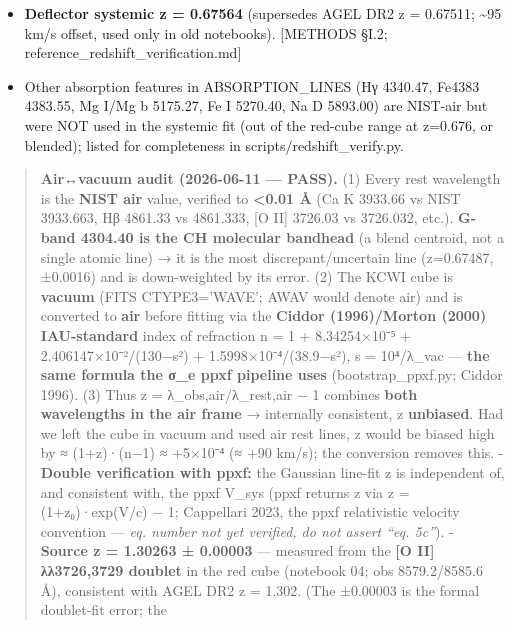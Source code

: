 \documentclass[
]{article}
\providecommand{\tightlist}{%
  \setlength{\itemsep}{0pt}\setlength{\parskip}{0pt}}
\newcommand{\BreakablePath}[1]{{\ttfamily\sloppy #1}}
\begin{document}
\begin{itemize}
\tightlist
\item
  \textbf{Deflector systemic z = 0.67564} (supersedes AGEL DR2 z =
  0.67511; \textasciitilde95 km/s offset, used only in old notebooks).
  {[}METHODS §I.2; reference\_redshift\_verification.md{]}
\item
  Other absorption features in
  \BreakablePath{ABSORPTION\_\discretionary{}{}{}LINES} (Hγ 4340.47,
  Fe4383 4383.55, Mg I/Mg b 5175.27, Fe I 5270.40, Na D 5893.00) are
  NIST-air but were NOT used in the systemic fit (out of the red-cube
  range at z=0.676, or blended); listed for completeness in
  \BreakablePath{scripts/\discretionary{}{}{}redshift\_\discretionary{}{}{}verify.\discretionary{}{}{}py}.
\end{itemize}

\begin{quote}
\textbf{Air↔vacuum audit (2026-06-11 --- PASS).} (1) Every rest
wavelength is the \textbf{NIST air} value, verified to
\textbf{\textless0.01 Å} (Ca K 3933.66 vs NIST 3933.663, Hβ 4861.33 vs
4861.333, {[}O II{]} 3726.03 vs 3726.032, etc.). \textbf{G-band 4304.40
is the CH molecular bandhead} (a blend centroid, not a single atomic
line) → it is the most discrepant/uncertain line (z=0.67487, ±0.0016)
and is down-weighted by its error. (2) The KCWI cube is \textbf{vacuum}
(FITS \BreakablePath{CTYPE3='WAVE'}; \BreakablePath{AWAV} would denote
air) and is converted to \textbf{air} before fitting via the
\textbf{Ciddor (1996)/Morton (2000) IAU-standard} index of refraction n
= 1 + 8.34254×10⁻⁵ + 2.406147×10⁻²/(130−s²) + 1.5998×10⁻⁴/(38.9−s²), s =
10⁴/λ\_vac --- \textbf{the same formula the σ\_e ppxf pipeline uses}
(\BreakablePath{bootstrap\_\discretionary{}{}{}ppxf.\discretionary{}{}{}py};
Ciddor 1996). (3) Thus z = λ\_obs,air/λ\_rest,air − 1 combines
\textbf{both wavelengths in the air frame} → internally consistent, z
\textbf{unbiased}. Had we left the cube in vacuum and used air rest
lines, z would be biased high by ≈ (1+z)·(n−1) ≈ +5×10⁻⁴ (≈ +90 km/s);
the conversion removes this. - \textbf{Double verification with ppxf:}
the Gaussian line-fit z is independent of, and consistent with, the ppxf
V\_sys (ppxf returns z via z = (1+z₀)·exp(V/c) − 1; Cappellari 2023, the
ppxf relativistic velocity convention --- \emph{eq. number not yet
verified, do not assert ``eq. 5c''}). - \textbf{Source z = 1.30263 ±
0.00003} --- measured from the \textbf{{[}O II{]} λλ3726,3729 doublet}
in the red cube (notebook 04; obs 8579.2/8585.6 Å), consistent with AGEL
DR2 z = 1.302. (The ±0.00003 is the formal doublet-fit error; the

\end{quote}
\end{document}
